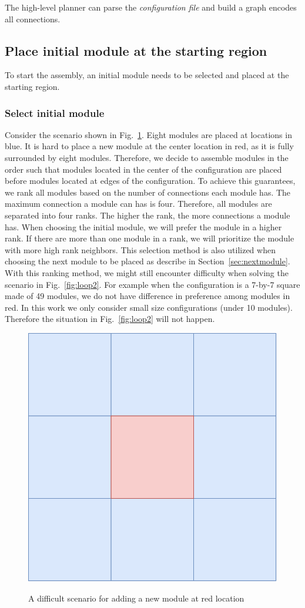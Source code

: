 The high-level planner can parse the {\it configuration file} and build a graph encodes all connections.

\subsection{Place initial module at the starting region}
To start the assembly, an initial module needs to be selected and placed at the starting region.
\subsubsection{Select initial module}
Consider the scenario shown in Fig.~\ref{fig:loop}. Eight modules are placed at locations in blue.
It is hard to place a new module at the center location in red, as it is  fully surrounded by eight modules. Therefore, we decide to assemble modules in the order such that modules located in the center of the configuration are placed before modules located at edges of the configuration.
To achieve this guarantees, we rank all modules based on the number of connections each module has. The maximum connection a module can has is four.
Therefore, all modules are separated into four ranks. The higher the rank, the more connections a module has. 
When choosing the initial module, we will prefer the module in a higher rank. 
If there are more than one module in a rank, we will prioritize the module with more high rank neighbors.
This selection method is also utilized when choosing the next module to be placed as describe in Section~\ref{sec:nextmodule}.
With this ranking method, we might still encounter difficulty when solving the scenario in Fig.~\ref{fig:loop2}.
For example when the configuration is a 7-by-7 square made of 49 modules, we do not have difference in preference among modules in red.
In this work we only consider small size configurations (under 10 modules). Therefore the situation in Fig.~\ref{fig:loop2} will not happen.

\begin{figure}[ht!]%
\centering
{\includegraphics[width=0.3\columnwidth]{pics/moduleloop.pdf}}
\caption{A difficult scenario for adding a new module at red location}
\label{fig:loop}
\end{figure}

